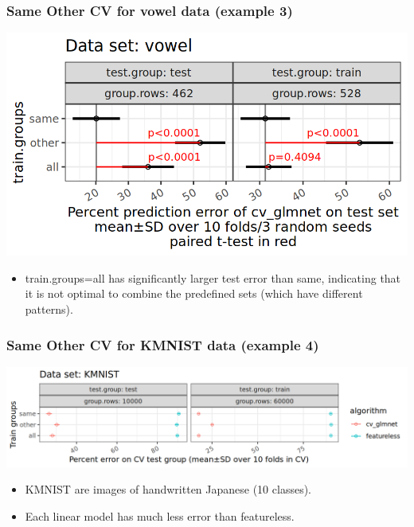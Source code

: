 \documentclass{beamer}
\begin{document}
\begin{frame}
  \frametitle{Same Other CV for vowel data (example 3)}
  \includegraphics[width=\textwidth]{vowel_error_glmnet_sizes_mean_SD_pvalue.png}
  \begin{itemize}
  \item train.groups=all has significantly larger test error than
    same, indicating that it is not optimal to combine the
    predefined sets (which have different patterns). 
  \end{itemize}
\end{frame}

\begin{frame}[fragile]
  \frametitle{Same Other CV for KMNIST data (example 4)}
  \includegraphics[width=\textwidth]{KMNIST_error_glmnet_featureless_mean_SD.png}
  \begin{itemize}
  \item KMNIST are images of handwritten Japanese (10 classes).
  \item Each linear model has much less error than featureless.
  \end{itemize}
\end{frame}
\end{document}
